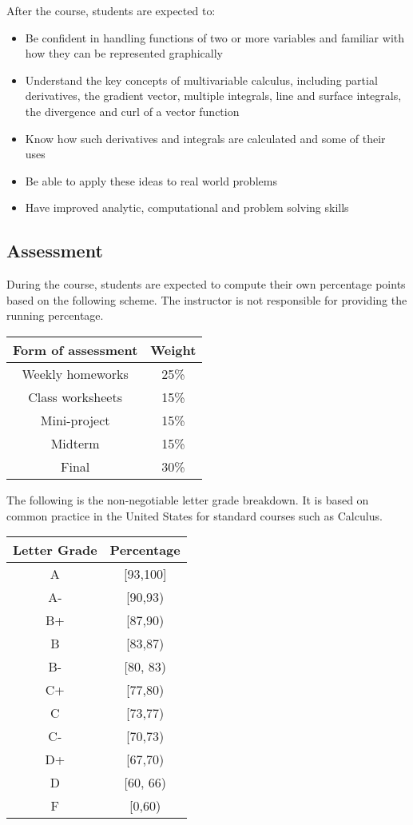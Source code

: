 \documentclass[
]{article}
\begin{document}
After the course, students are expected to:

\begin{itemize}
\item
  Be confident in handling functions of two or more variables and familiar with how
  they can be represented graphically
\item
  Understand the key concepts of multivariable calculus, including partial derivatives,
  the gradient vector, multiple integrals, line and surface integrals, the divergence and
  curl of a vector function
\item
  Know how such derivatives and integrals are calculated and some of their uses
\item
  Be able to apply these ideas to real world problems
\item
  Have improved analytic, computational and problem solving skills
\end{itemize}

\hypertarget{assessment}{%
\subsection*{Assessment}\label{assessment}}

During the course, students are expected to compute their own percentage
points based on the following scheme.
The instructor is not responsible for providing the running percentage.

\begin{longtable}[]{@{}cc@{}}
\toprule\noalign{}
\textbf{Form of assessment} & \textbf{Weight} \\
\midrule\noalign{}
\endhead
\bottomrule\noalign{}
\endlastfoot
Weekly homeworks & 25\% \\
Class worksheets & 15\% \\
Mini-project & 15\% \\
Midterm & 15\% \\
Final & 30\% \\
\end{longtable}

The following is the non-negotiable letter grade breakdown. It is based on
common practice in the United States for standard courses such as Calculus.

\begin{longtable}[]{@{}cc@{}}
\toprule\noalign{}
\textbf{Letter Grade} & \textbf{Percentage} \\
\midrule\noalign{}
\endhead
\bottomrule\noalign{}
\endlastfoot
A & {[}93,100{]} \\
A- & {[}90,93) \\
B+ & {[}87,90) \\
B & {[}83,87) \\
B- & {[}80, 83) \\
C+ & {[}77,80) \\
C & {[}73,77) \\
C- & {[}70,73) \\
D+ & {[}67,70) \\
D & {[}60, 66) \\
F & {[}0,60) \\
\end{longtable}
\end{document}
